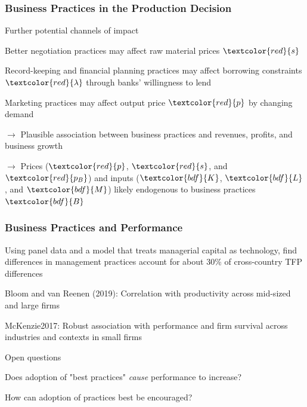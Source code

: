 \documentclass[hideothersubsections, usenames,dvipsnames,11pt]{beamer}
\newenvironment{itemize_2pt}{\itemize\addtolength{\itemsep}{2pt}}{\enditemize}
\newenvironment{enumerate_2pt}{\enumerate\addtolength{\itemsep}{2pt}}{\endenumerate}
\begin{document}
\begin{frame}
\frametitle{Business Practices in the Production Decision}

Further potential channels of impact
\begin{enumerate_2pt}
	\item Better negotiation practices may affect raw material prices $\textcolor{red}{s}$
	\item Record-keeping and financial planning practices may affect borrowing constraints $\textcolor{red}{\lambda}$ through banks' willingness to lend \citep[see, e.g.,][]{Bruhn2013} %
	\item Marketing practices may affect output price $\textcolor{red}{p}$ by changing demand

	\item[] $\rightarrow$ Plausible association between business practices and revenues, profits, and business growth
	\item[] $\rightarrow$ Prices ($\textcolor{red}{p}$, $\textcolor{red}{s}$, and $\textcolor{red}{p_{B}}$) and inputs ($\textcolor{bdf}{K}$, $\textcolor{bdf}{L}$, and $\textcolor{bdf}{M}$) likely endogenous to business practices $\textcolor{bdf}{B}$
\end{enumerate_2pt}

\end{frame}



\begin{frame}
\frametitle{Business Practices and Performance}
	\begin{itemize_2pt}
	\item Using panel data and a model that treats managerial capital as technology, \citet{Bloom2016} find differences in management practices account for about 30\% of cross-country TFP differences
	\item Bloom and van Reenen (2019): Correlation with productivity across mid-sized and large firms \citep{Bloom2019}
	\item McKenzie2017: \textcolor{bdf}{Robust association with performance and firm survival} across industries and contexts in small firms
	\end{itemize_2pt}
	
\vspace{0.1in}	
	
	Open questions
	\begin{itemize_2pt}
		\item Does adoption of "best practices" \emph{cause} performance to increase?
		\item How can adoption of practices best be encouraged?
	\end{itemize_2pt}	
	
\end{frame}
\end{document}
